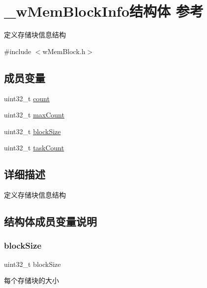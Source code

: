 \hypertarget{struct__w_mem_block_info}{}\section{\+\_\+w\+Mem\+Block\+Info结构体 参考}
\label{struct__w_mem_block_info}


定义存储块信息结构  




{\ttfamily \#include $<$w\+Mem\+Block.\+h$>$}

\subsection*{成员变量}
\begin{DoxyCompactItemize}
\item 
uint32\+\_\+t \mbox{\hyperlink{struct__w_mem_block_info_a86988a65e0d3ece7990c032c159786d6}{count}}
\item 
uint32\+\_\+t \mbox{\hyperlink{struct__w_mem_block_info_a1cc8a4ba5eee24b560f9869012941e91}{max\+Count}}
\item 
uint32\+\_\+t \mbox{\hyperlink{struct__w_mem_block_info_ab6558f40a619c2502fbc24c880fd4fb0}{block\+Size}}
\item 
uint32\+\_\+t \mbox{\hyperlink{struct__w_mem_block_info_a80462c64b9184115aa568f08227f7f4a}{task\+Count}}
\end{DoxyCompactItemize}


\subsection{详细描述}
定义存储块信息结构 

\subsection{结构体成员变量说明}
\mbox{\label{struct__w_mem_block_info_ab6558f40a619c2502fbc24c880fd4fb0}} 
\subsubsection{\texorpdfstring{block\+Size}{blockSize}}
{\footnotesize\ttfamily uint32\+\_\+t block\+Size}

每个存储块的大小 \mbox{\label{struct__w_mem_block_info_a86988a65e0d3ece7990c032c159786d6}} 
